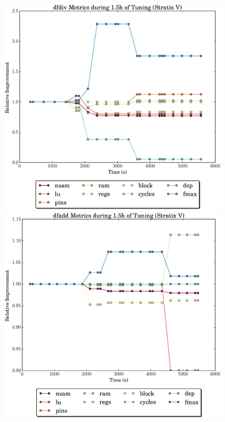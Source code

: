 \documentclass[12pt, a4paper]{article}
\begin{document}
\begin{figure}[htpb]
    \begin{minipage}{.48\textwidth}
        \includegraphics[scale=.29]{dfdiv_all_5400_chstone_StratixV}
    \end{minipage}%
    \hfill
    \begin{minipage}{.48\textwidth}
        \includegraphics[scale=.29]{dfadd_all_5400_chstone_StratixV}
    \end{minipage}%
\end{figure}
\end{document}
